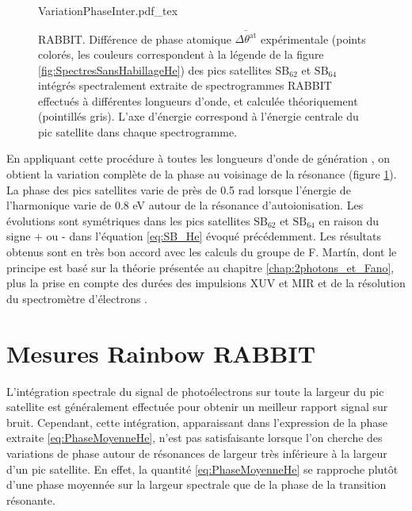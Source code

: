 \begin{figure}
\centering
\def\svgwidth{\textwidth}
{VariationPhaseInter.pdf_tex}
\caption{RABBIT. Différence de phase atomique $\bar{\Delta \theta^{\text{at}}}$ expérimentale (points colorés, les couleurs correspondent à la légende de la figure \ref{fig:SpectresSansHabillageHe}) des pics satellites $\text{SB}_{62}$ et $\text{SB}_{64}$ intégrés spectralement extraite de spectrogrammes RABBIT effectués à différentes longueurs d'onde, et calculée théoriquement (pointillés gris). L'axe d'énergie correspond à l'énergie centrale du pic satellite dans chaque spectrogramme.}
\label{fig:VariationPhaseInter}
\end{figure}

En appliquant cette procédure à toutes les longueurs d'onde de génération , on obtient la variation complète de la phase au voisinage de la résonance (figure  \ref{fig:VariationPhaseInter}). La phase des pics satellites varie de près de 0.5 rad lorsque l'énergie de l'harmonique varie de 0.8 eV autour de la résonance d'autoionisation. Les évolutions sont symétriques dans les pics satellites $\text{SB}_{62}$ et $\text{SB}_{64}$ en raison du signe + ou - dans l'équation \ref{eq:SB_He} évoqué précédemment. Les résultats obtenus sont en très bon accord avec les calculs du groupe de F. Mart\'{i}n, dont le principe est basé sur la théorie présentée au chapitre \ref{chap:2photons_et_Fano}, plus la prise en compte des durées des impulsions XUV et MIR et de la résolution du spectromètre d'électrons .

\section{Mesures Rainbow RABBIT}
L'intégration spectrale du signal de photoélectrons sur toute la largeur du pic satellite est généralement effectuée pour obtenir un meilleur rapport signal sur bruit. Cependant, cette intégration, apparaissant dans l'expression de la phase extraite \ref{eq:PhaseMoyenneHe}, n'est pas satisfaisante lorsque l'on cherche des variations de phase autour de résonances de largeur très inférieure à la largeur d'un pic satellite. En effet, la quantité \ref{eq:PhaseMoyenneHe} se rapproche plutôt d'une phase moyennée sur la largeur spectrale  que de la phase de la transition résonante. 

